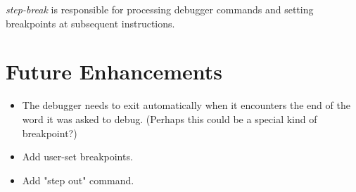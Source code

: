 \textit{step-break} is responsible for processing debugger commands and
setting breakpoints at subsequent instructions.


\section{Future Enhancements}
\begin{itemize}[noitemsep]
	\item The debugger needs to exit automatically when it
	encounters the end of the word it was asked to debug. (Perhaps
	this could be a special kind of breakpoint?)

	\item Add user-set breakpoints.
	\item Add "step out" command.
\end{itemize}
